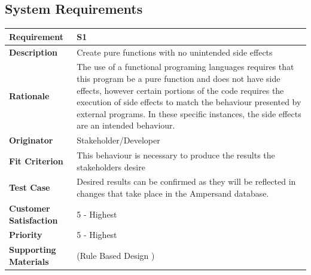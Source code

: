 \documentclass[12pt]{report}
\begin{document}
\subsection{System Requirements}
{\setlength{\tabcolsep}{6pt} %
    \begin{tabularx}{\textwidth}{>{\bfseries}m{3cm}X}
        Requirement & S1 \\ 
        \midrule
        \endhead
        Description  & Create pure functions with no unintended side effects
        \\	Rationale & The use of a functional programing languages requires 
        that this program be a pure function and does not have side effects, 
        however certain portions of the code requires the execution of side 
        effects to match the behaviour presented by external programs. In these 
        specific instances, the side effects are an intended behaviour.
        \\	Originator & Stakeholder/Developer
        
        \\	Fit Criterion & This behaviour is necessary to produce the results 
        the stakeholders desire
        \\ Test Case & Desired results can be confirmed as they will be 
        reflected in changes that take place in the Ampersand database.
        \\	Customer Satisfaction & 5 - Highest 
        \\	Priority & 5 - Highest 
        \\	Supporting Materials & (Rule Based Design \cite {RBD})
        \vspace{12pt}
    \end{tabularx}
}
\end{document}
